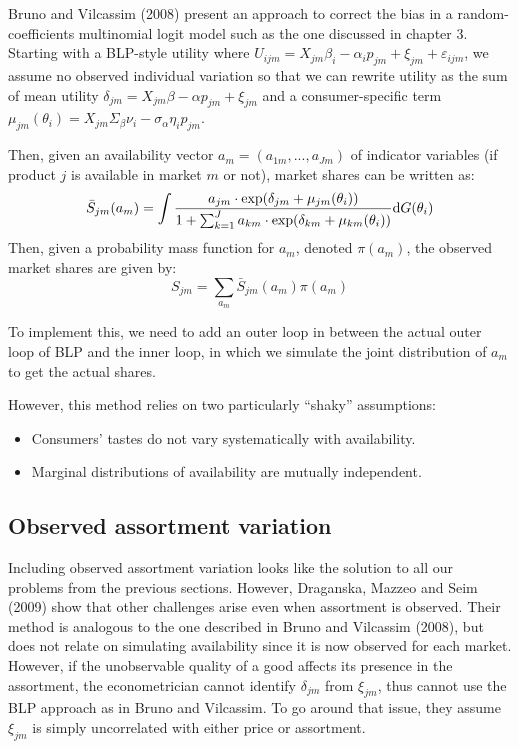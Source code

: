 Bruno and Vilcassim (2008) present an approach to correct the bias in a random-coefficients multinomial logit model such as the one discussed in chapter 3. Starting with a BLP-style utility where $U_{ijm} = X_{jm}\beta_i - \alpha_i p_{jm} + \xi_{jm} + \varepsilon_{ijm}$, we assume no observed individual variation so that we can rewrite utility as the sum of mean utility $\delta_{jm} = X_{jm}\beta - \alpha p_{jm} + \xi_{jm}$ and a consumer-specific term $\mu_{jm}(\theta_i) = X_{jm}\Sigma_{\beta}\nu_i - \sigma_\alpha \eta_i p_{jm}$.

Then, given an availability vector $a_m = (a_{1m}, ..., a_{Jm})$ of indicator variables (if product $j$ is available in market $m$ or not), market shares can be written as: $$ \bar S_{jm}(a_m) = \int \frac{a_{jm}\cdot \exp(\delta_{jm} + \mu_{jm}(\theta_i))}{1 + \sum_{k=1}^J a_{km}\cdot \exp(\delta_{km} + \mu_{km}(\theta_i)) } \mathrm{d} G(\theta_i) $$
Then, given a probability mass function for $a_m$, denoted $\pi(a_m)$, the observed market shares are given by: $$ S_{jm} = \sum_{a_m} \bar S_{jm}(a_m) \pi(a_m) $$

To implement this, we need to add an outer loop in between the actual outer loop of BLP and the inner loop, in which we simulate the joint distribution of $a_m$ to get the actual shares.

However, this method relies on two particularly ``shaky'' assumptions:\begin{itemize}
\item Consumers' tastes do not vary systematically with availability.
\item Marginal distributions of availability are mutually independent.
\end{itemize}

\subsection{Observed assortment variation}

Including observed assortment variation looks like the solution to all our problems from the previous sections. However, Draganska, Mazzeo and Seim (2009) show that other challenges arise even when assortment is observed. Their method is analogous to the one described in Bruno and Vilcassim (2008), but does not relate on simulating availability since it is now observed for each market. However, if the unobservable quality of a good affects its presence in the assortment, the econometrician cannot identify $\delta_{jm}$ from $\xi_{jm}$, thus cannot use the BLP approach as in Bruno and Vilcassim. To go around that issue, they assume $\xi_{jm}$ is simply uncorrelated with either price or assortment.

